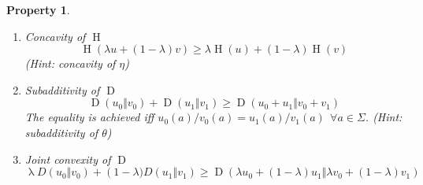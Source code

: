 \documentclass[aps,pra,onecolumn,notitlepage,superscriptaddress]{revtex4-1}
\newcommand{\op}[1]{\operatorname{#1}}
\newtheorem{proper}{Property}
\def\Proof{{\bf Proof.~}}
\def\qed{$\blacksquare$ \newline}
\begin{document}
\begin{proper}
\begin{enumerate}
\begin{equation}
            \end{equation}
            The equality is achieved iff $\alpha_0/\beta_0 = \alpha_1/\beta_1$.
            \newline\Proof
            \begin{align*}
                \theta(\alpha_0,\beta_0) + \theta(\alpha_1,\beta_1)
                &= -(\beta_0 + \beta_1) \left[ \frac{\beta_0}{\beta_0 + \beta_1} \eta\left(\frac{\alpha_0}{\beta_0}\right) + \frac{\beta_1}{\beta_0 + \beta_1} \eta\left(\frac{\alpha_1}{\beta_1}\right)  \right] \\
                &\geq -(\beta_0 + \beta_1) \eta\left(\frac{\alpha_0 + \alpha_1}{\beta_0 + \beta_1}\right) \\
                &= \theta(\alpha_0 + \alpha_1, \beta_0 + \beta_1)
            \end{align*}
            \qed

            \item Concavity of $\op H$
            \begin{equation}
                \op H(\lambda u + (1-\lambda) v) \geq \lambda \op H(u) + (1-\lambda) \op H(v)
            \end{equation}
            (Hint: concavity of $\eta$)

            \item Subadditivity of $\op D$
            \begin{equation}
                \op D(u_0 \Vert v_0) + \op D(u_1 \Vert v_1) \geq \op D(u_0+u_1 \Vert v_0+v_1)
            \end{equation}
            The equality is achieved iff $u_0(a)/v_0(a) = u_1(a)/v_1(a) \ \ \forall a \in \Sigma$.
            (Hint: subadditivity of $\theta$)

            \item Joint convexity of $\op D$
            \begin{equation}
                \op \lambda D(u_0 \Vert v_0) + \op (1-\lambda) D(u_1 \Vert v_1) \geq \op D(\lambda u_0+(1-\lambda)u_1 \Vert \lambda v_0+(1-\lambda)v_1)
            \end{equation}


\end{enumerate}
\end{proper}
\end{document}
